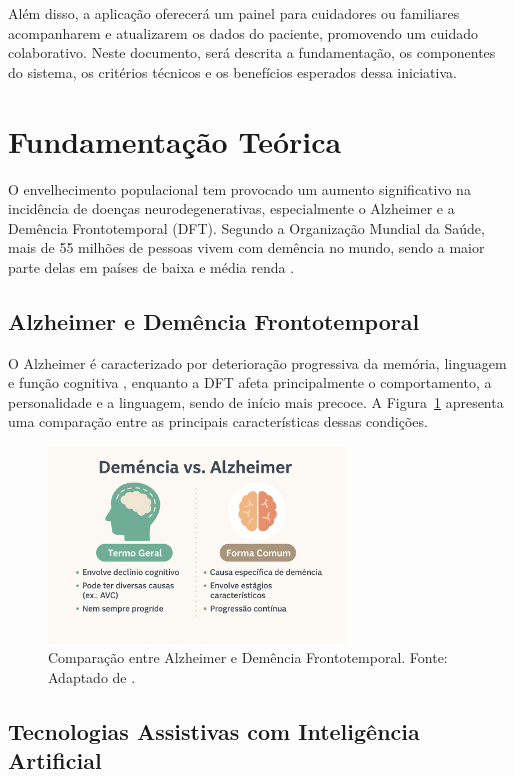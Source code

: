 \documentclass[12pt]{article}
\begin{document}
Além disso, a aplicação oferecerá um painel para cuidadores ou familiares acompanharem e atualizarem os dados do paciente, promovendo um cuidado colaborativo. Neste documento, será descrita a fundamentação, os componentes do sistema, os critérios técnicos e os benefícios esperados dessa iniciativa.

\section{Fundamentação Teórica}

O envelhecimento populacional tem provocado um aumento significativo na incidência de doenças neurodegenerativas, especialmente o Alzheimer e a Demência Frontotemporal (DFT). Segundo a Organização Mundial da Saúde, mais de 55 milhões de pessoas vivem com demência no mundo, sendo a maior parte delas em países de baixa e média renda \cite{who2021}.

\subsection{Alzheimer e Demência Frontotemporal}

O Alzheimer é caracterizado por deterioração progressiva da memória, linguagem e função cognitiva \cite{alzheimer-association}, enquanto a DFT afeta principalmente o comportamento, a personalidade e a linguagem, sendo de início mais precoce. A Figura~\ref{fig:comparacao} apresenta uma comparação entre as principais características dessas condições.

\begin{figure}[h]
\centering
\includegraphics[width=0.7\textwidth]{exemplo-demencia-vs-alzheimer.png}
\caption{Comparação entre Alzheimer e Demência Frontotemporal. Fonte: Adaptado de \cite{alzheimer-association}.}
\label{fig:comparacao}
\end{figure}

\subsection{Tecnologias Assistivas com Inteligência Artificial}
\end{document}
